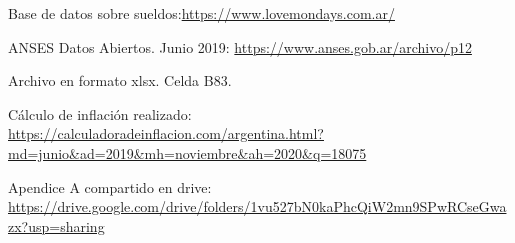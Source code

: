 \begin{thebibliography}{99}


Base de datos sobre sueldos:{\tiny  \url{https://www.lovemondays.com.ar/}}

ANSES Datos Abiertos. Junio 2019: {\tiny \url{https://www.anses.gob.ar/archivo/p12}}

Archivo en formato xlsx. Celda B83.

Cálculo de inflación realizado: {\tiny \url{https://calculadoradeinflacion.com/argentina.html?md=junio&ad=2019&mh=noviembre&ah=2020&q=18075}}

Apendice A compartido en drive: {\tiny \url{https://drive.google.com/drive/folders/1vu527bN0kaPhcQiW2mn9SPwRCseGwazx?usp=sharing}}

\end{thebibliography}
